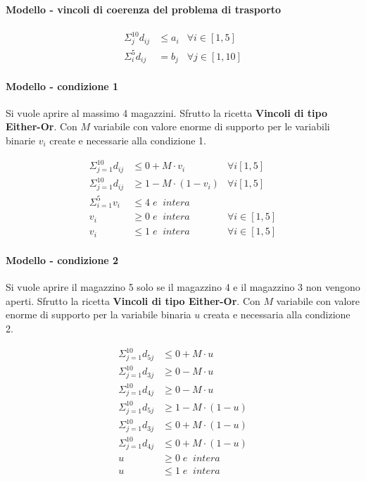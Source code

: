 \documentclass[a4paper,12pt,oneside]{article}
\begin{document}
\paragraph{Modello - vincoli di coerenza del problema di trasporto}
\begin{align*}
  \Sigma ^ {10} _ {j} d_{ij} &\leq a_{i} & \forall i \in [1,5] \\
  \Sigma ^ {5} _ {i} d_{ij} &= b_{j} & \forall j \in [1,10]
\end{align*}

\paragraph{Modello - condizione 1}

Si vuole aprire al massimo 4 magazzini. Sfrutto la ricetta \textbf{Vincoli di tipo Either-Or}.
Con $M$ variabile con valore enorme di supporto per le variabili binarie $v_i$ create e necessarie alla condizione 1.

\begin{align*}
  \Sigma ^ {10} _ {j=1} d_{ij} &\leq 0 + M \cdot v_i & \forall i [1,5] \\
  \Sigma ^ {10} _ {j=1} d_{ij} &\geq 1 - M \cdot (1 - v_i) & \forall i [1,5] \\
  \Sigma ^ {5} _ {i=1} v_i &\leq 4 \; e \;\; intera \\
  v_i &\geq 0 \; e \;\; intera & \forall i \in [1,5] \\
  v_i &\leq 1 \; e \;\; intera & \forall i \in [1,5]
\end{align*}

\paragraph{Modello - condizione 2}
Si vuole aprire il magazzino 5 solo se il magazzino 4 e il magazzino 3 non vengono aperti.
Sfrutto la ricetta \textbf{Vincoli di tipo Either-Or}.
Con $M$ variabile con valore enorme di supporto per la variabile binaria $u$ creata e necessaria alla condizione 2.

\begin{align*}
  \Sigma ^ {10} _ {j=1} d_{5j} &\leq 0 + M \cdot u \\
  \Sigma ^ {10} _ {j=1} d_{3j} &\geq 0 - M \cdot u \\
  \Sigma ^ {10} _ {j=1} d_{4j} &\geq 0 - M \cdot u \\
  \Sigma ^ {10} _ {j=1} d_{5j} &\geq 1 - M \cdot (1 - u) \\
  \Sigma ^ {10} _ {j=1} d_{3j} &\leq 0 + M \cdot (1 - u) \\
  \Sigma ^ {10} _ {j=1} d_{4j} &\leq 0 + M \cdot (1 - u) \\
  u &\geq 0 \; e \;\; intera \\
  u &\leq 1 \; e \;\; intera
\end{align*}
\end{document}
